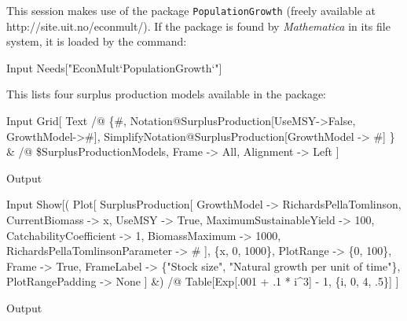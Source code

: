 \documentclass[11pt,fleqn]{book} %
\begin{document}
\begin{theorem}
\hfill \break 
This session makes use of the package \texttt{PopulationGrowth} (freely available at \\ http://site.uit.no/econmult/). If the package is found by \textit{Mathematica} in its file system, it is loaded by the command:
\begin{mmaCell}[index=1]{Input}
  Needs["EconMult`PopulationGrowth`"]
\end{mmaCell}
This lists four surplus production models available in the package:
\begin{mmaCell}{Input}
  Grid[
    Text /@ \{#, 
      Notation@SurplusProduction[UseMSY->False, GrowthModel->#],
      SimplifyNotation@SurplusProduction[GrowthModel -> #]
    \} & /@ \$SurplusProductionModels, 
    Frame     -> All, 
    Alignment -> Left
  ]
\end{mmaCell}
\begin{mmaCell}[moregraphics={moreig={scale=1.2}}]{Output}
\end{mmaCell}
\begin{mmaCell}{Input}
  Show[(
    Plot[
      SurplusProduction[
        GrowthModel                     -> RichardsPellaTomlinson, 
        CurrentBiomass                  -> x, 
        UseMSY                          -> True, 
        MaximumSustainableYield         -> 100, 
        CatchabilityCoefficient         -> 1, 
        BiomassMaximum                  -> 1000,
        RichardsPellaTomlinsonParameter -> #
      ], \{x, 0, 1000\}, 
      PlotRange        -> \{0, 100\}, 
      Frame            -> True, 
      FrameLabel       -> \{"Stock size",
        "Natural growth per unit of time"\}, 
      PlotRangePadding -> None
    ] &) /@ Table[Exp[.001 + .1 * i^3] - 1, \{i, 0, 4, .5\}]
  ]
\end{mmaCell}
\begin{mmaCell}[moregraphics={moreig={scale=.9}}]{Output}
\end{mmaCell}
\label{code:growth}
\end{theorem}

\begin{figure}[!htb]
\end{figure}
\end{document}
